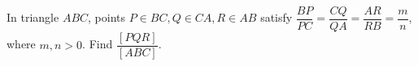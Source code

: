 In triangle $ABC$, points $P\in BC,Q\in CA,R\in AB$ satisfy $\dfrac{BP}{PC}=\dfrac{CQ}{QA}=\dfrac{AR}{RB}=\dfrac{m}{n}$, where $m,n>0$. Find $\dfrac{[PQR]}{[ABC]}$.

